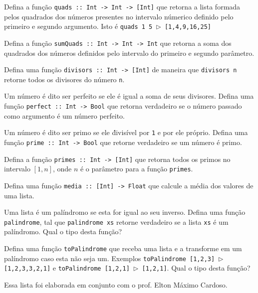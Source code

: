 \documentclass[a4paper,11pt]{exam}
\begin{document}
\begin{questions}
     
	  \item Defina a fun\c{c}\~ao \texttt{quads :: Int -> Int -> [Int]} que retorna a lista formada pelos quadrados
	        dos n\'umeros presentes no intervalo n\'umerico definido pelo primeiro e segundo argumento. Isto \'e
	        \texttt{quads 1 5 $\rhd$ [1,4,9,16,25]}
	  \item Defina a fun\c{c}\~ao \texttt{sumQuads :: Int -> Int -> Int} que retorna a soma dos quadrados dos n\'umeros
	        definidos pelo intervalo do primeiro e segundo par\^ametro.  
	  \item Defina uma fun\c{c}\~ao \texttt{divisors :: Int -> [Int]} de maneira que \texttt{divisors n} retorne todos os
	        divisores do n\'umero \texttt{n}.
	  \item Um n\'umero \'e dito ser perfeito se ele \'e igual a soma de seus divisores. Defina uma fun\c{c}\~ao 
	        \texttt{perfect :: Int -> Bool} que retorna verdadeiro se o n\'umero passado como argumento \'e um 
	        n\'umero perfeito.
	  \item Um n\'umero \'e dito ser primo se ele \' divis\'ivel por \texttt{1} e por ele pr\'oprio. 
	        Defina uma fun\c{c}\~ao \texttt{prime :: Int -> Bool} que
                retorne verdadeiro se um n\'umero \'e primo.
          \item Defina a função \texttt{primes :: Int -> [Int]} que retorna
            todos os primos no intervalo $[1,n]$, onde $n$ \'e o par\^ametro
            para a função \texttt{primes}.
	  \item Defina uma fun\c{c}\~ao \texttt{media :: [Int] -> Float} que calcule a m\'edia dos valores de uma lista.
	  \item Uma lista \'e um pal\'indromo se esta for igual ao seu
            inverso. Defina uma fun\c{c}\~ao \texttt{palindrome}, tal que \texttt{palindrome xs} retorne verdadeiro se a lista
	        \texttt{xs} \'e um pal\'indromo. Qual o tipo desta fun\c{c}\~ao?
	  \item Defina uma fun\c{c}\~ao \texttt{toPalindrome} que receba uma lista e a transforme em um pal\'indromo caso
	        esta n\~ao seja um. Exemplos \texttt{toPalindrome [1,2,3] $\rhd$ [1,2,3,3,2,1]} e 
	        \texttt{toPalindrome [1,2,1] $\rhd$ [1,2,1]}. Qual o tipo
                desta fun\c{c}\~ao? 
           \item[\ ]
           \item[\ ] Essa lista foi elaborada em conjunto com o prof. Elton
             M\'aximo Cardoso.

\end{questions}
\end{document}
